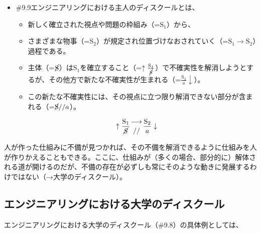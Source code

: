 \begin{note}{}
  \begin{itemize}
    \tightlist
    \item{\#9.9}エンジニアリングにおける主人のディスクールとは、
      \begin{itemize}
        \tightlist
        \item 新しく確立された視点や問題の枠組み（=$\textrm{S}_1$）から、
        \item さまざまな物事（=$\textrm{S}_2$）が規定され位置づけなおされていく（=$\textrm{S}_1\rightarrow\textrm{S}_2$）過程である。
        \item 主体（=$\cancel{\textrm{S}}$）は$\textrm{S}_1$を確立すること（=$\uparrow\frac{\mathrm{S_1}}{\mathrm{\cancel{S}}}$）で不確実性を解消しようとするが、その他方で新たな不確実性が生まれる（=$\frac{\mathrm{S_2}}{a}\downarrow$）。
        \item この新たな不確実性には、その視点に立つ限り解消できない部分が含まれる（=$\cancel{\textrm{S}}//a$）。
      \end{itemize}

$$
\uparrow\frac{\mathrm{S_1}}{\mathrm{\cancel{S}}}\genfrac{}{}{0pt}{}{\longrightarrow}{//}\frac{\mathrm{S_2}}{a}\downarrow
$$
  \end{itemize}
\end{note}

人が作った仕組みに不備が見つかれば、その不備を解消できるように仕組みを人が作りかえることもできる。ここに、仕組みが（多くの場合、部分的に）解体される道が開けるのだが、不備の存在が必ずしも常にそのような動きに発展するわけではない（→大学のディスクール）。

\subsection{エンジニアリングにおける大学のディスクール}\label{ux30a8ux30f3ux30b8ux30cbux30a2ux30eaux30f3ux30b0ux306bux304aux3051ux308bux5927ux5b66ux306eux30c7ux30a3ux30b9ux30afux30fcux30eb}

エンジニアリングにおける大学のディスクール（\#9.8）の具体例としては、

